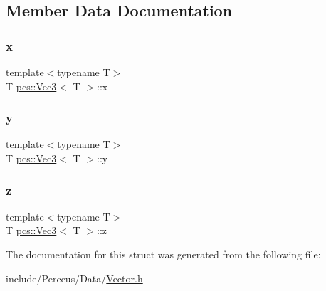 \subsection{Member Data Documentation}
\mbox{\label{structpcs_1_1Vec3_af2913616acb265b9bb0fdb398b6cd8bb}} 
\subsubsection{\texorpdfstring{x}{x}}
{\footnotesize\ttfamily template$<$typename T$>$ \\
T \hyperlink{structpcs_1_1Vec3}{pcs\+::\+Vec3}$<$ T $>$\+::x}

\mbox{\label{structpcs_1_1Vec3_a1b7b628b32cee6a44ed1954af1acabf8}} 
\subsubsection{\texorpdfstring{y}{y}}
{\footnotesize\ttfamily template$<$typename T$>$ \\
T \hyperlink{structpcs_1_1Vec3}{pcs\+::\+Vec3}$<$ T $>$\+::y}

\mbox{\label{structpcs_1_1Vec3_a957b418609c5a11a4bb21e6a8f0381b4}} 
\subsubsection{\texorpdfstring{z}{z}}
{\footnotesize\ttfamily template$<$typename T$>$ \\
T \hyperlink{structpcs_1_1Vec3}{pcs\+::\+Vec3}$<$ T $>$\+::z}



The documentation for this struct was generated from the following file\+:\begin{DoxyCompactItemize}
\item 
include/\+Perceus/\+Data/\hyperlink{Vector_8h}{Vector.\+h}\end{DoxyCompactItemize}
